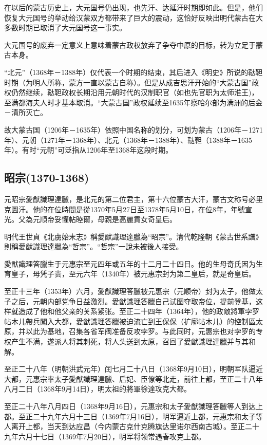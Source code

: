 在以后的蒙古历史上，大元国号仍出现，也先汗、达延汗时期即如此。但是，他们恢复大元国号的举动给汉蒙双方都带来了巨大的震动，这恰好反映出明代蒙古在大多数时期已取消了大元国号这一事实。

大元国号的废弃一定意义上意味着蒙古政权放弃了争夺中原的目标，转为立足于蒙古本身。

“北元”（1368年－1388年）仅代表一个时期的结束，其后进入《明史》所说的鞑靼时期（为明人所称，蒙方一直以蒙古自称）。但是从成吉思汗开始的“大蒙古国”政权仍然继续，鞑靼政权长期沿用元朝时代的汉制职官（如也先官职为太师淮王)，至满都海夫人时才基本取消。“大蒙古国”政权延续至1635年察哈尔部为满洲的后金－清所灭亡。

故大蒙古国（1206年－1635年）依照中国名称的划分，可划为蒙古（1206年－1271年）、元朝（1271年－1368年）、北元（1368年－1388年）、鞑靼（1388年－1635年）。有时“元朝”可泛指从1206年至1368年这段时期。

\subsection{昭宗\tiny(1370-1368)}

元昭宗愛猷識理達臘，是北元的第二位君主，第十六位蒙古大汗，蒙古文称号必里克圖汗。他的在位時間是從1370年5月27日至1378年5月10日，在位8年，年號宣光。父為元順帝妥懽帖睦爾，母親是高麗貢女奇皇后。

明代王世貞《北虜始末志》稱愛猷識理達臘為“昭宗”。清代乾隆朝《蒙古世系譜》則稱愛猷識理達臘為“哲宗”。“哲宗”一說未被後人接受。

愛猷識理答臘生于元惠宗至元四年或五年的十二月二十四日。他的生母奇氏因为生育皇子，母凭子贵，至元六年（1340年）被元惠宗封为第二皇后，就是奇皇后。

至正十三年（1353年）六月，愛猷識理答臘被元惠宗（元顺帝）封为太子，他做太子之后，元朝内部党争日益激烈。愛猷識理答臘自己试图夺取帝位，提前登基，这样就造成了他和他父亲的关系紧张。至正二十四年（1364年），他的政敵將軍孛罗帖木儿帶兵闖入大都，愛猷識理答臘被迫流亡到王保保（扩廓帖木儿）的控制區太原，并以此为基地，召集各省军阀准备反攻孛罗。与此同时，元惠宗也对孛罗的专权产生不满，遂派人将其刺死，将人头送到太原，召回了愛猷識理達臘并与其和解。

至正二十八年（明朝洪武元年）闰七月二十八日（1368年9月10日），明朝军队逼近大都，元惠宗率太子愛猷識理達臘、后妃、臣僚等北走，前往上都，至正二十八年八月二日（1368年9月14日），明太祖的將軍徐達攻克大都。

至正二十八年八月四日（1368年9月16日），元惠宗和太子愛猷識理答臘等人到达上都。至正二十九年六月十三日（1369年7月16日），明军逼近上都，元惠宗和太子等人离开上都，当天到达应昌（今内蒙古克什克腾旗达里诺尔西南古城）。至正二十九年六月十七日（1369年7月20日），明军将领常遇春攻克上都。

